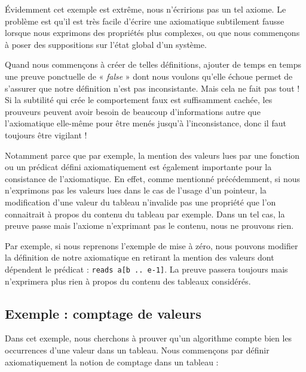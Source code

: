 \documentclass[12pt,francais,]{scrbook}
\begin{document}
Évidemment cet exemple est extrême, nous n'écririons pas un tel axiome.
Le problème est qu'il est très facile d'écrire une axiomatique
subtilement fausse lorsque nous exprimons des propriétés plus complexes,
ou que nous commençons à poser des suppositions sur l'état global d'un
système.

Quand nous commençons à créer de telles définitions, ajouter de temps en
temps une preuve ponctuelle de « \emph{false} » dont nous voulons
qu'elle échoue permet de s'assurer que notre définition n'est pas
inconsistante. Mais cela ne fait pas tout ! Si la subtilité qui crée le
comportement faux est suffisamment cachée, les prouveurs peuvent avoir
besoin de beaucoup d'informations autre que l'axiomatique elle-même pour
être menés jusqu'à l'inconsistance, donc il faut toujours être vigilant
!

Notamment parce que par exemple, la mention des valeurs lues par une
fonction ou un prédicat défini axiomatiquement est également importante
pour la consistance de l'axiomatique. En effet, comme mentionné
précédemment, si nous n'exprimons pas les valeurs lues dans le cas de
l'usage d'un pointeur, la modification d'une valeur du tableau
n'invalide pas une propriété que l'on connaitrait à propos du contenu du
tableau par exemple. Dans un tel cas, la preuve passe mais l'axiome
n'exprimant pas le contenu, nous ne prouvons rien.

Par exemple, si nous reprenons l'exemple de mise à zéro, nous pouvons
modifier la définition de notre axiomatique en retirant la mention des
valeurs dont dépendent le prédicat : \texttt{reads\ a{[}b\ ..\ e-1{]}}.
La preuve passera toujours mais n'exprimera plus rien à propos du
contenu des tableaux considérés.

\subsection{Exemple : comptage de
valeurs}\label{exemple-comptage-de-valeurs}

Dans cet exemple, nous cherchons à prouver qu'un algorithme compte bien
les occurrences d'une valeur dans un tableau. Nous commençons par
définir axiomatiquement la notion de comptage dans un tableau :
\end{document}
